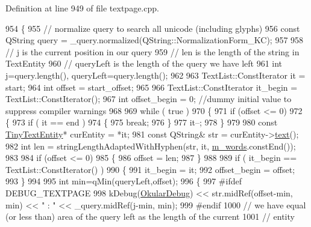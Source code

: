 Definition at line 949 of file textpage.\+cpp.


\begin{DoxyCode}
954 \{
955     \textcolor{comment}{// normalize query to search all unicode (including glyphs)}
956     \textcolor{keyword}{const} QString query = \_query.normalized(QString::NormalizationForm\_KC);
957 
958     \textcolor{comment}{// j is the current position in our query}
959     \textcolor{comment}{// len is the length of the string in TextEntity}
960     \textcolor{comment}{// queryLeft is the length of the query we have left}
961     \textcolor{keywordtype}{int} j=query.length(), queryLeft=query.length();
962 
963     TextList::ConstIterator it = start;
964     \textcolor{keywordtype}{int} offset = start\_offset;
965 
966     TextList::ConstIterator it\_begin = TextList::ConstIterator();
967     \textcolor{keywordtype}{int} offset\_begin = 0; \textcolor{comment}{//dummy initial value to suppress compiler warnings}
968 
969     \textcolor{keywordflow}{while} ( \textcolor{keyword}{true} )
970     \{
971         \textcolor{keywordflow}{if} (offset <= 0)
972         \{
973             \textcolor{keywordflow}{if} ( it == end )
974             \{
975                 \textcolor{keywordflow}{break};
976             \}
977             it--;
978         \}
979 
980         \textcolor{keyword}{const} \hyperlink{classTinyTextEntity}{TinyTextEntity}* curEntity = *it;
981         \textcolor{keyword}{const} QString& str = curEntity->\hyperlink{classTinyTextEntity_a9657105c457630e898ea823ddc87d278}{text}();
982         \textcolor{keywordtype}{int} len = stringLengthAdaptedWithHyphen(str, it, \hyperlink{classOkular_1_1TextPagePrivate_a36b703334a8775136cb4308209afd1cb}{m\_words}.constEnd());
983 
984         \textcolor{keywordflow}{if} (offset <= 0)
985         \{
986             offset = len;
987         \}
988 
989         \textcolor{keywordflow}{if} ( it\_begin == TextList::ConstIterator() )
990         \{
991             it\_begin = it;
992             offset\_begin = offset;
993         \}
994 
995         \textcolor{keywordtype}{int} min=qMin(queryLeft,offset);
996         \{
997 \textcolor{preprocessor}{#ifdef DEBUG\_TEXTPAGE}
998             kDebug(\hyperlink{debug__p_8h_af16c6e32a95969dd0605d792ec9807c7}{OkularDebug}) << str.midRef(offset-min, min) << \textcolor{stringliteral}{" : "} << \_query.midRef(j-min, 
      min);
999 \textcolor{preprocessor}{#endif}
1000             \textcolor{comment}{// we have equal (or less than) area of the query left as the length of the current }
1001             \textcolor{comment}{// entity}

\end{DoxyCode}
